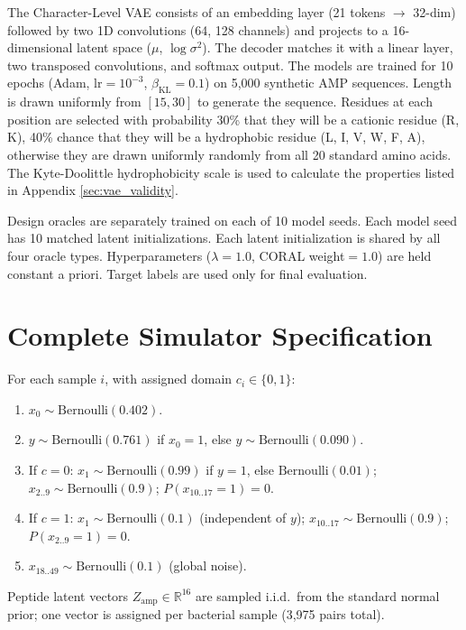 \documentclass{article}
\begin{document}
The Character-Level VAE consists of an embedding layer (21 tokens $\to$ 32-dim) followed by two 1D convolutions (64, 128 channels) and projects to a 16-dimensional latent space ($\mu$, $\log \sigma^2$). The decoder matches it with a linear layer, two transposed convolutions, and softmax output. The models are trained for 10 epochs (Adam, lr$= 10^{-3}$, $\beta_{\text{KL}} = 0.1$) on 5,000 synthetic AMP sequences. Length is drawn uniformly from $[15, 30]$ to generate the sequence. Residues at each position are selected with probability 30\% that they will be a cationic residue (R, K), 40\% chance that they will be a hydrophobic residue (L, I, V, W, F, A), otherwise they are drawn uniformly randomly from all 20 standard amino acids. The Kyte-Doolittle hydrophobicity scale is used to calculate the properties listed in Appendix \ref{sec:vae_validity}.

Design oracles are separately trained on each of 10 model seeds. Each model seed has 10 matched latent initializations. Each latent initialization is shared by all four oracle types. Hyperparameters ($\lambda = 1.0$, CORAL weight$= 1.0$) are held constant a priori. Target labels are used only for final evaluation.

\section{Complete Simulator Specification} \label{sec:simulator}
For each sample $i$, with assigned domain $c_i \in \{0,1\}$:
\begin{enumerate}
    \item $x_0 \sim \text{Bernoulli}(0.402)$.
    \item $y \sim \text{Bernoulli}(0.761)$ if $x_0{=}1$, else $y \sim \text{Bernoulli}(0.090)$.
    \item If $c{=}0$: $x_1 \sim \text{Bernoulli}(0.99)$ if $y{=}1$, else $\text{Bernoulli}(0.01)$; $x_{2..9} \sim \text{Bernoulli}(0.9)$; $P(x_{10..17}{=}1) = 0$.
    \item If $c{=}1$: $x_1 \sim \text{Bernoulli}(0.1)$ (independent of $y$); $x_{10..17} \sim \text{Bernoulli}(0.9)$; $P(x_{2..9}{=}1) = 0$.
    \item $x_{18..49} \sim \text{Bernoulli}(0.1)$ (global noise).
\end{enumerate}
Peptide latent vectors $Z_{\text{amp}} \in \mathbb{R}^{16}$ are sampled i.i.d.\ from the standard normal prior; one vector is assigned per bacterial sample (3,975 pairs total).
\end{document}

